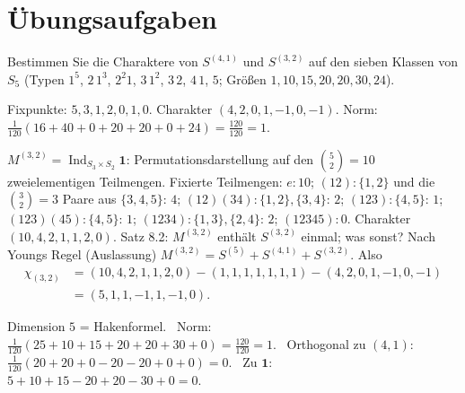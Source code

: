 \section{Übungsaufgaben}

\begin{aufgabe}
Bestimmen Sie die Charaktere von $S^{(4,1)}$ und $S^{(3,2)}$ auf den sieben Klassen von $S_5$ (Typen $1^{5}$, $2\,1^{3}$, $2^{2}1$, $3\,1^{2}$, $3\,2$, $4\,1$, $5$; Größen $1, 10, 15, 20, 20, 30, 24$).

\loesung
{}
Fixpunkte: $5, 3, 1, 2, 0, 1, 0$. Charakter $(4, 2, 0, 1, -1, 0, -1)$. Norm: $\frac1{120}(16 + 40 + 0 + 20 + 20 + 0 + 24) = \frac{120}{120} = 1$. \checkmark

$M^{(3,2)} = \operatorname{Ind}_{S_3\times S_2}\mathbf 1$: Permutationsdarstellung auf den $\binom52 = 10$ zweielementigen Teilmengen. Fixierte Teilmengen: $e\colon10$; $(12)\colon\{1, 2\}$ und die $\binom32 = 3$ Paare aus $\{3, 4, 5\}$: $4$; $(12)(34)\colon\{1, 2\}, \{3, 4\}$: $2$; $(123)\colon\{4, 5\}$: $1$; $(123)(45)\colon\{4, 5\}$: $1$; $(1234)\colon\{1, 3\}, \{2, 4\}$: $2$; $(12345)\colon0$. Charakter $(10, 4, 2, 1, 1, 2, 0)$. Satz 8.2: $M^{(3,2)}$ enthält $S^{(3,2)}$ einmal; was sonst? Nach Youngs Regel (Auslassung) $M^{(3,2)} = S^{(5)} + S^{(4,1)} + S^{(3,2)}$. Also
\begin{align*} \chi_{(3,2)} &= (10, 4, 2, 1, 1, 2, 0) - (1, 1, 1, 1, 1, 1, 1) - (4, 2, 0, 1, -1, 0, -1)\\ &= (5, 1, 1, -1, 1, -1, 0) . \end{align*}

Dimension $5$ = Hakenformel. \checkmark\ Norm: $\frac1{120}(25 + 10 + 15 + 20 + 20 + 30 + 0) = \frac{120}{120} = 1$. \checkmark\ Orthogonal zu $(4, 1)$: $\frac1{120}(20 + 20 + 0 - 20 - 20 + 0 + 0) = 0$. \checkmark\ Zu $\mathbf 1$: $5 + 10 + 15 - 20 + 20 - 30 + 0 = 0$. \checkmark

\begin{center}
\begin{minipage}{0.88\textwidth}
\end{minipage}
\end{center}
\end{aufgabe}


